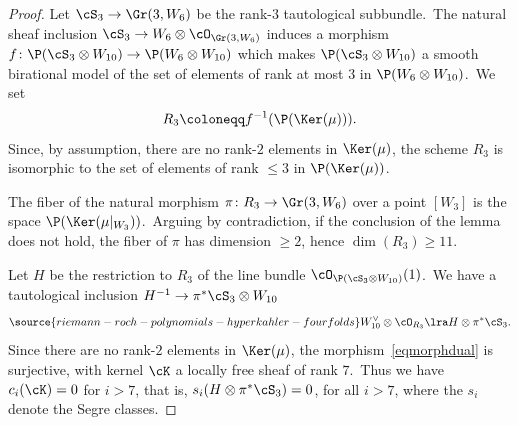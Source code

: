 \begin{proof}
Let $\cS_3\to \Gr(3,W_6)$ be the rank-$3$ tautological subbundle.\
The natural sheaf inclusion $\cS_3\to  W_6\otimes \cO_{\Gr(3,W_6)}$ induces a morphism $f\colon \P(\cS_3\otimes W_{10})\to\P(W_6\otimes W_{10})$ which makes $\P(\cS_3\otimes W_{10})$ a smooth birational model of the set of elements of rank at most $ 3$ in $\P(W_6\otimes W_{10})$.\
We set
\[
R_3\coloneqq f^{-1}(\P(\Ker(\mu))).
\]
Since, by assumption, there are no rank-$2$ elements in $\Ker(\mu)$, the scheme $R_3$ is isomorphic to the set of elements of rank $\leq 3$ in $\P(\Ker(\mu))$.

The fiber of the natural morphism $\pi\colon R_3\to\Gr(3,W_6)$ over a point $[W_3]$ is the space $\P(\Ker(\mu\vert_{W_3}))$.\
Arguing by contradiction, if the conclusion of the lemma does not hold, the fiber of $\pi$ has dimension $\geq 2$, hence $\dim (R_3)\geq 11$.

Let $H$ be  the restriction to $R_3$ of the line bundle $\cO_{\P(\cS_3\otimes W_{10})}(1)$.\
We have a tautological inclusion $H^{-1}\to \pi^* \cS_3\otimes W_{10}$
\begin{equation}\label{eqmorphdual}
\source{riemann-roch-polynomials-hyperkahler-fourfolds}
W_{10}^\vee\otimes \cO_{R_3}\lra  H\otimes \pi^*\cS_3.
\end{equation}
Since there are no rank-$2$ elements in $\Ker (\mu)$,  the morphism~\eqref{eqmorphdual}  is surjective, with kernel $\cK $ a locally free sheaf  of rank $7$.\
Thus we have $c_i(\cK)=0$ for $i>7$, that is, $s_i(H\otimes \pi^*\cS_3)=0$, for all $i>7$, where the $s_i$ denote the Segre classes.



\end{proof}
